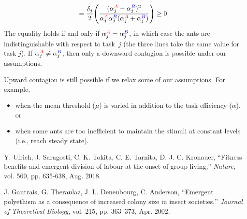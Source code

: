 \documentclass[11pt]{article}
\newcommand{\A}{{\color{red}A}}
\newcommand{\B}{{\color{blue}B}}
\begin{document}
\begin{appendices}
\begin{align}
    & = \frac{\delta_j}{2} \Bigg( 
    \frac{ (\alpha_j^{\A} - \alpha_j^{\B})^2 }{\alpha_j^{\A}\alpha_j^{\B}(\alpha_j^{\A} + \alpha_j^{\B})} \Bigg) \geq 0
\end{align}
The equality holds if and only if $\alpha_j^{\A} = \alpha_j^{\B}$, in which case the ants are indistinguishable with respect to task~$j$ (the three lines take the same value for task $j$). If $\alpha_j^{\A}
\neq \alpha_j^{\B}$, then only a downward contagion is possible under our assumptions.

Upward contagion is still possible if we relax some of our assumptions. For example,
\begin{itemize}
    \item when the mean threshold ($\mu$) is varied in addition to the task efficiency ($\alpha$), or
    \item when some ants are too inefficient to maintain the stimuli at constant levels (i.e., reach steady state).
\end{itemize}

\end{appendices}


\begin{thebibliography}{99}

 Y. Ulrich, J. Saragosti, C. K. Tokita, C. E. Tarnita, D. J. C. Kronauer, ``Fitness benefits and emergent division of labour at the onset of group living,'' \textit{Nature}, vol. 560, pp. 635-638, Aug. 2018.

 J. Gautrais, G. Theraulaz, J. L. Deneubourg, C. Anderson, ``Emergent polyethism as a consequence of increased colony size in insect societies,'' \textit{Journal of Theoretical Biology}, vol. 215, pp. 363–373, Apr. 2002.

\end{thebibliography}
\end{document}
